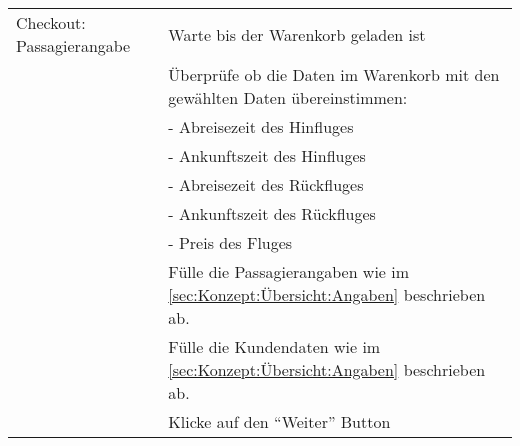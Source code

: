 \begin{table}[H]
\begin{tabularx}{0.9\textwidth}{ | l | X | }
		\multirow{1}{*}{Checkout: Passagierangabe} & Warte bis der Warenkorb geladen ist \\ \cline{2-2}
		& Überprüfe ob die Daten im Warenkorb mit den gewählten Daten übereinstimmen: \\ \cline{2-2}
		& - Abreisezeit des Hinfluges \\ \cline{2-2}
		& - Ankunftszeit des Hinfluges \\ \cline{2-2}
		& - Abreisezeit des Rückfluges \\ \cline{2-2}
		& - Ankunftszeit des Rückfluges \\ \cline{2-2}
		& - Preis des Fluges \\ \cline{2-2}
		& Fülle die Passagierangaben wie im \cref{sec:Konzept:Übersicht:Angaben} \nameref{sec:Konzept:Übersicht:Angaben} beschrieben ab. \\ \cline{2-2}
		& Fülle die Kundendaten wie im \cref{sec:Konzept:Übersicht:Angaben} \nameref{sec:Konzept:Übersicht:Angaben} beschrieben ab. \\ \cline{2-2}
		& Klicke auf den "`Weiter"' Button \\ \hline
		

\end{tabularx}
\end{table}

